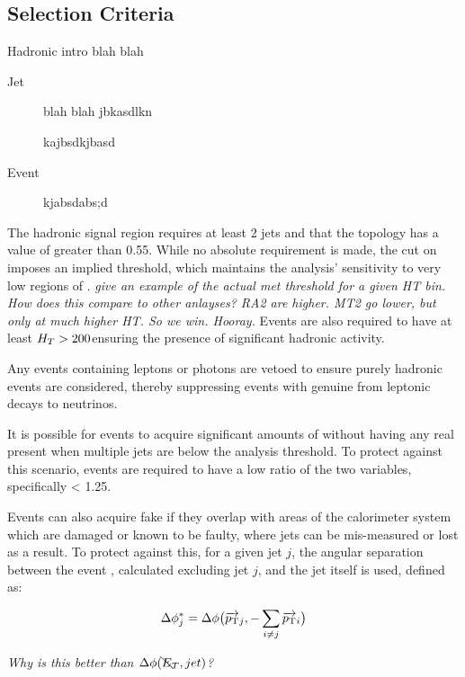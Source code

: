 \subsection{Selection Criteria}
\label{sec:selec_crit}

Hadronic intro blah blah

\begin{description}
\item[Jet]blah blah
jbkasdlkn

kajbsdkjbasd

\item[Event]kjabsdabs;d

\end{description}

The hadronic signal region
requires at least 2 jets and that the topology has a value of \alphat greater than
0.55. While no absolute \met requirement is made, the cut on 
\alphat imposes an implied threshold, which maintains the analysis'
sensitivity to very low regions of \met. \emph{give an example of the actual met
threshold for a given HT bin. How does this compare to other anlayses? RA2 are 
higher. MT2 go lower, but only at much higher HT. So we win. Hooray.} Events are also required to have at least
$H_T > 200$\gev ensuring the presence of significant hadronic activity.

Any events containing leptons or photons are vetoed to ensure purely hadronic events
are considered, thereby suppressing events with genuine \met from leptonic decays to
neutrinos.

It is possible for events to acquire significant amounts of \mht without having any
real \met present when multiple jets are below the analysis threshold. To protect against 
this scenario, events are required to have a low ratio of the two variables, specifically
\mhtmet < 1.25.

Events can also acquire fake \mht if they overlap with areas of the calorimeter 
system which are damaged or known to be faulty, where jets can be mis-measured or 
lost as a result. To protect against this, for a given jet $j$, the angular separation
between the event \mht, calculated excluding jet $j$, and the jet itself is used, defined
as:

\begin{equation}
\Delta \phi^*_j = \Delta \phi\big(\overrightarrow{{p_{\text T}}}_j,-\sum_{i\neq j}{\overrightarrow{{p_{\text T}}}_i}\big)
\label{eq:biasdphi}
\end{equation}

\emph{Why is this better than $\Delta \phi(\bcancel{E}_T, jet)$?}

